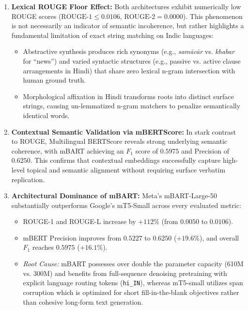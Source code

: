\begin{enumerate}
    \item \textbf{Lexical ROUGE Floor Effect:} Both architectures exhibit numerically low ROUGE scores ($\text{ROUGE-1} \le 0.0106$, $\text{ROUGE-2} = 0.0000$). This phenomenon is not necessarily an indicator of semantic incoherence, but rather highlights a fundamental limitation of exact string matching on Indic languages:
    \begin{itemize}
        \item Abstractive synthesis produces rich synonyms (e.g., \textit{samācār} vs. \textit{khabar} for ``news'') and varied syntactic structures (e.g., passive vs. active clause arrangements in Hindi) that share zero lexical n-gram intersection with human ground truth.
        \item Morphological affixation in Hindi transforms roots into distinct surface strings, causing un-lemmatized n-gram matchers to penalize semantically identical words.
    \end{itemize}
    \item \textbf{Contextual Semantic Validation via mBERTScore:} In stark contrast to ROUGE, Multilingual BERTScore reveals strong underlying semantic coherence, with mBART achieving an $F_1$ score of $\mathbf{0.5975}$ and Precision of $\mathbf{0.6250}$. This confirms that contextual embeddings successfully capture high-level topical and semantic alignment without requiring surface verbatim replication.
    \item \textbf{Architectural Dominance of mBART:} Meta's mBART-Large-50 substantially outperforms Google's mT5-Small across every evaluated metric:
    \begin{itemize}
        \item ROUGE-1 and ROUGE-L increase by $+112\%$ (from $0.0050$ to $0.0106$).
        \item mBERT Precision improves from $0.5227$ to $0.6250$ ($+19.6\%$), and overall $F_1$ reaches $0.5975$ ($+16.1\%$).
        \item \textit{Root Cause:} mBART possesses over double the parameter capacity (610M vs. 300M) and benefits from full-sequence denoising pretraining with explicit language routing tokens (\texttt{hi\_IN}), whereas mT5-small utilizes span corruption which is optimized for short fill-in-the-blank objectives rather than cohesive long-form text generation.
    \end{itemize}
\end{enumerate}

